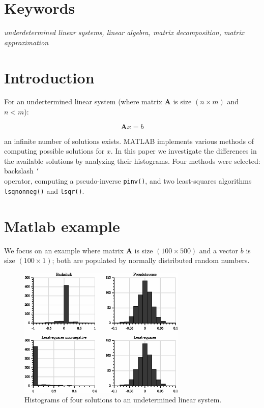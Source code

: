 \documentclass[10pt,twocolumn]{article}
\begin{document}
\section*{Keywords}

\textit{underdetermined linear systems, linear algebra, matrix decomposition, matrix approximation}

\tableofcontents

\section{Introduction}

For an undertermined linear system (where matrix $\bm{A}$ is size $(n \times m)$ and $n<m$):

\begin{equation}
\bm{A} x = b
\end{equation}


an infinite number of solutions exists. MATLAB implements various methods of computing possible solutions for $x$. In this paper we investigate the differences in the available solutions by analyzing their histograms. Four methods were selected: backslash \texttt{\char`\\} operator, computing a pseudo-inverse \texttt{pinv()}, and two least-squares algorithms \texttt{lsqnonneg()} and \texttt{lsqr()}.

\section{Matlab example}

We focus on an example where matrix $\bm{A}$ is size $(100 \times 500)$ and a vector $b$ is size $(100 \times 1)$; both are populated by normally distributed random numbers.

\begin{figure}[H]
\centering\includegraphics[width=8cm]{DWGs/histograms.eps}
\caption{Histograms of four solutions to an undetermined linear system.}			
\label{fig:histograms}
\end{figure}
\end{document}
